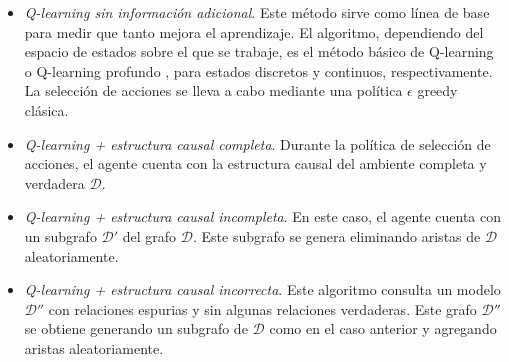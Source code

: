 \begin{itemize}
    \item \textit{Q-learning sin información adicional}. Este método sirve como
    línea de base para medir que tanto mejora el aprendizaje. El algoritmo, dependiendo del espacio de estados sobre el que se trabaje, es el 
    método básico de Q-learning \cite{watkins1992q} o Q-learning profundo \cite{mnih2013playing}, para estados
    discretos y continuos, respectivamente. La selección de acciones se lleva a cabo mediante una política $\epsilon$ greedy clásica.
    \item \textit{Q-learning + estructura causal completa}. Durante la política de selección de acciones, el agente cuenta con la estructura causal del ambiente completa y verdadera $\mathcal{D}$.
    \item \textit{Q-learning + estructura causal incompleta}. En este caso, el agente cuenta con un subgrafo $\mathcal{D'}$ del grafo $\mathcal{D}$. Este subgrafo se genera eliminando aristas de $\mathcal{D}$ aleatoriamente.
    \item \textit{Q-learning + estructura causal incorrecta}. Este algoritmo consulta un modelo $\mathcal{D}''$ con relaciones espurias y sin algunas relaciones verdaderas. Este grafo $\mathcal{D}''$ se obtiene generando un subgrafo de $\mathcal{D}$ como en el caso anterior y agregando aristas aleatoriamente.
\end{itemize}

